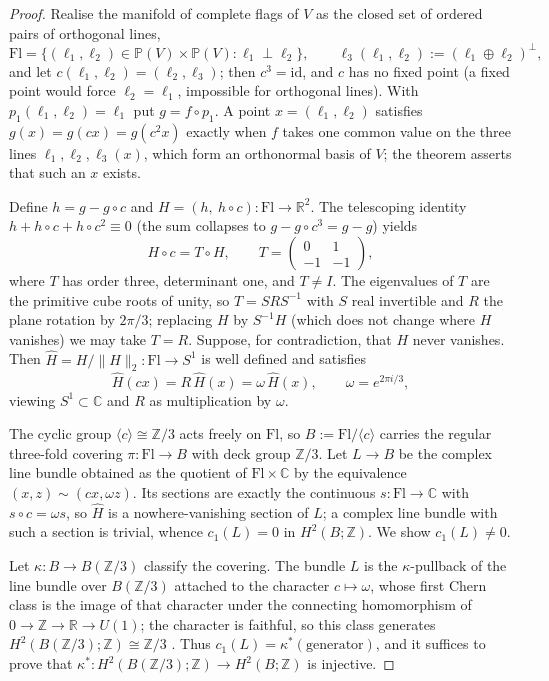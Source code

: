 \documentclass[11pt,a4paper]{article}
\begin{document}
\begin{proof}
Realise the manifold of complete flags of $V$ as the closed set of ordered pairs
of orthogonal lines,
\[
\mathrm{Fl}=\bigl\{(\ell_1,\ell_2)\in\mathbb P(V)\times\mathbb P(V):
\ell_1\perp\ell_2\bigr\},
\qquad
\ell_3(\ell_1,\ell_2):=(\ell_1\oplus\ell_2)^\perp,
\]
and let $c(\ell_1,\ell_2)=(\ell_2,\ell_3)$; then $c^3=\mathrm{id}$, and $c$ has
no fixed point (a fixed point would force $\ell_2=\ell_1$, impossible for
orthogonal lines). With $p_1(\ell_1,\ell_2)=\ell_1$ put $g=f\circ p_1$. A point
$x=(\ell_1,\ell_2)$ satisfies $g(x)=g(cx)=g(c^2x)$ exactly when $f$ takes one
common value on the three lines $\ell_1,\ell_2,\ell_3(x)$, which form an
orthonormal basis of $V$; the theorem asserts that such an $x$ exists.

Define $h=g-g\circ c$ and $H=(h,\ h\circ c)\colon\mathrm{Fl}\to\mathbb R^2$. The
telescoping identity $h+h\circ c+h\circ c^2\equiv0$ (the sum collapses to
$g-g\circ c^3=g-g$) yields
\[
H\circ c=T\circ H,\qquad
T=\begin{pmatrix}0&1\\-1&-1\end{pmatrix},
\]
where $T$ has order three, determinant one, and $T\neq I$. The eigenvalues of $T$
are the primitive cube roots of unity, so $T=SRS^{-1}$ with $S$ real invertible
and $R$ the plane rotation by $2\pi/3$; replacing $H$ by $S^{-1}H$ (which does not
change where $H$ vanishes) we may take $T=R$. Suppose, for contradiction, that
$H$ never vanishes. Then $\widehat H=H/\|H\|_2\colon\mathrm{Fl}\to S^1$ is
well defined and satisfies
\[
\widehat H(cx)=R\,\widehat H(x)=\omega\,\widehat H(x),
\qquad \omega=e^{2\pi i/3},
\]
viewing $S^1\subset\mathbb C$ and $R$ as multiplication by $\omega$.

The cyclic group $\langle c\rangle\cong\mathbb Z/3$ acts freely on $\mathrm{Fl}$,
so $B:=\mathrm{Fl}/\langle c\rangle$ carries the regular three-fold covering
$\pi\colon\mathrm{Fl}\to B$ with deck group $\mathbb Z/3$. Let
$L\to B$ be the complex line bundle obtained as the quotient of
$\mathrm{Fl}\times\mathbb C$ by the equivalence $(x,z)\sim(cx,\omega z)$. Its
sections are exactly the continuous $s\colon\mathrm{Fl}\to\mathbb C$ with
$s\circ c=\omega s$, so $\widehat H$ is a nowhere-vanishing section of $L$; a
complex line bundle with such a section is trivial, whence $c_1(L)=0$ in
$H^2(B;\mathbb Z)$. We show $c_1(L)\neq0$.

Let $\kappa\colon B\to B(\mathbb Z/3)$ classify the covering. The bundle $L$ is
the $\kappa$-pullback of the line bundle over $B(\mathbb Z/3)$ attached to the
character $c\mapsto\omega$, whose first Chern class is the image of that
character under the connecting homomorphism of
$0\to\mathbb Z\to\mathbb R\to U(1)$; the character is faithful, so this class
generates $H^2(B(\mathbb Z/3);\mathbb Z)\cong\mathbb Z/3$
\cite{Brown1982,MilnorStasheff1974}. Thus $c_1(L)=\kappa^*(\text{generator})$,
and it suffices to prove that
$\kappa^*\colon H^2(B(\mathbb Z/3);\mathbb Z)\to H^2(B;\mathbb Z)$ is injective.


\end{proof}
\end{document}
